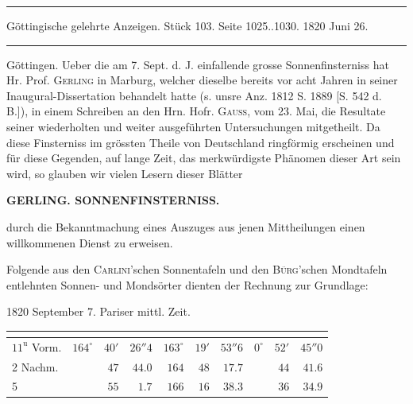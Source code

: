 \par\bigskip
\hypertarget{native-627-lower}{}
\begin{center}
\parbox{.92\linewidth}{\centering\small
\rule{\linewidth}{.3pt}\par\smallskip
Göttingische gelehrte Anzeigen. Stück 103. Seite 1025..1030. 1820 Juni 26.\par\smallskip
\rule{\linewidth}{.3pt}}
\end{center}
\par\medskip

Göttingen. Ueber die am 7. Sept. d. J. einfallende grosse Sonnenfinsterniss hat Hr. Prof. \textsc{Gerling} in Marburg, welcher dieselbe bereits vor acht Jahren in seiner Inaugural-Dissertation behandelt hatte (s. unsre Anz. 1812 S. 1889 [S. 542 d. B.]), in einem Schreiben an den Hrn. Hofr. \textsc{Gauss}, vom 23. Mai, die Resultate seiner wiederholten und weiter ausgeführten Untersuchungen mitgetheilt. Da diese Finsterniss im grössten Theile von Deutschland ringförmig erscheinen und für diese Gegenden, auf lange Zeit, das merkwürdigste Phänomen dieser Art sein wird, so glauben wir vielen Lesern dieser Blätter\par
\clearpage
{}
\noindent\makebox[10mm][l]{}%
\parbox[b]{\dimexpr\textwidth-20mm\relax}{\centering\small\textbf{GERLING. SONNENFINSTERNISS.}}%
\par\nobreak\medskip
\noindent durch die Bekanntmachung eines Auszuges aus jenen Mittheilungen einen willkommenen Dienst zu erweisen.

Folgende aus den \textsc{Carlini}'schen Sonnentafeln und den \textsc{Bürg}'schen Mondtafeln entlehnten Sonnen- und Mondsörter dienten der Rechnung zur Grundlage:

1820 September 7. Pariser mittl. Zeit.

\begin{center}
\small\setlength{\tabcolsep}{2pt}\begin{tabular}{l|rrr|rrr|rrr}
 &  &  &  \\
\hline
$11^{\mathrm u}$ Vorm. & $164^\circ$ & $40'$ & $26''4$ & $163^\circ$ & $19'$ & $53''6$ & $0^\circ$ & $52'$ & $45''0$ \\
2 Nachm. & & $47$ & $44.0$ & $164$ & $48$ & $17.7$ & & $44$ & $41.6$ \\
5 & & $55$ & $1.7$ & $166$ & $16$ & $38.3$ & & $36$ & $34.9$ \\
\end{tabular}
\end{center}

